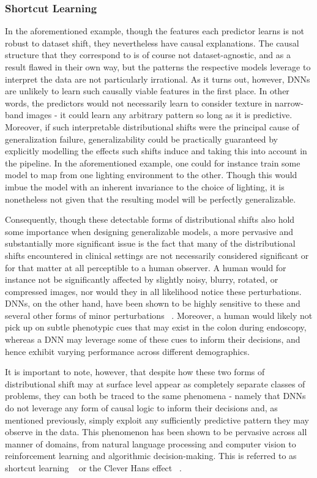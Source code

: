 	\subsubsection{Shortcut Learning}
	In the aforementioned example, though the features each predictor learns is not robust to dataset shift, they nevertheless have causal explanations. The causal structure that they correspond to is of course not dataset-agnostic, and as a result flawed in their own way, but the patterns the respective models leverage to interpret the data are not particularly irrational. As it turns out, however, DNNs are unlikely to learn such causally viable features in the first place. In other words, the predictors would not necessarily learn to consider texture in narrow-band images - it could learn any arbitrary pattern so long as it is predictive. Moreover, if such interpretable distributional shifts were the principal cause of generalization failure, generalizability could be practically guaranteed by explicitly modelling the effects such shifts induce and taking this into account in the pipeline. In the aforementioned example, one could for instance train some model to map from one lighting environment to the other. Though this would imbue the model with an inherent invariance to the choice of lighting, it is nonetheless not given that the resulting model will be perfectly generalizable.

	Consequently, though these detectable forms of distributional shifts also hold some importance when designing generalizable models, a more pervasive and substantially more significant issue is the fact that many of the distributional shifts encountered in clinical settings are not necessarily considered significant or for that matter at all perceptible to a human observer. A human would for instance not be significantly affected by slightly noisy, blurry, rotated, or compressed images, nor would they in all likelihood notice these perturbations. DNNs, on the other hand, have been shown to be highly sensitive to these and several other forms of minor perturbations ~\cite{noise_robustness, corruption_robustness,adversarial_training,benchmarking_robustness}. Moreover, a human would likely not pick up on subtle phenotypic cues that may exist in the colon during endoscopy, whereas a DNN may leverage some of these cues to inform their decisions, and hence exhibit varying performance across different demographics. 

	It is important to note, however, that despite how these two forms of distributional shift may at surface level appear as completely separate classes of problems, they can both be traced to the same phenomena - namely that DNNs do not leverage any form of causal logic to inform their decisions and, as mentioned previously, simply exploit any sufficiently predictive pattern they may observe in the data. This phenomenon has been shown to be pervasive across all manner of domains, from natural language processing and computer vision to reinforcement learning and algorithmic decision-making. This is referred to as shortcut learning ~\cite{shortcut_learning} or the Clever Hans effect ~\cite{cleverhans}. 

